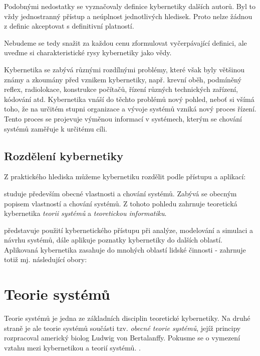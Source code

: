       Podobnými nedostatky se vyznačovaly definice kybernetiky dalších autorů. Byl to vždy 
      jednostranný přístup a neúplnost jednotlivých hledisek. Proto nelze žádnou z definic 
      akceptovat s definitivní platností.
      
      Nebudeme se tedy snažit za každou cenu zformulovat vyčerpávající definici, ale uveďme si 
      charakteristické rysy kybernetiky jako vědy.
      
      Kybernetika se zabývá různými rozdílnými problémy, které však byly většinou známy a zkoumány 
      před vznikem kybernetiky, např. krevní oběh, podmíněný reflex, radiolokace, konstrukce 
      počítačů, řízení různých technických zařízení, kódování atd. Kybernetika vnáší do těchto 
      problémů nový pohled, neboť si všímá toho, že na určitém stupni organizace a vývoje systémů 
      vzniká nový proces řízení. Tento proces se projevuje výměnou informací v systémech, kterým se 
      chování systémů zaměřuje k určitému cíli.
      
    \subsection{Rozdělení kybernetiky}
      Z praktického hlediska můžeme kybernetiku rozdělit podle přístupu a aplikací:
      
    \begin{description}[leftmargin=3em,labelindent=1em, style=nextline]
      \item[Teoretická kybernetika] studuje především obecné vlastnosti a chování systémů. Zabývá 
            se obecným popisem vlastností a chování systémů. Z tohoto pohledu zahrnuje teoretická 
            kybernetika \emph{teorii systémů} a \emph{teoretickou informatiku}.
      
      \item[Aplikovaná kybernetika] představuje použití kybernetického přístupu při analýze, 
      modelování a simulaci a návrhu systémů, dále aplikuje poznatky kybernetiky do dalších 
      oblastí. Aplikovaná kybernetika zasahuje do mnohých oblastí lidské činnosti - zahrnuje totiž 
      mj. následující obory:
    \end{description}
 
  \section{Teorie systémů}\label{tky:IchapIsecII}
     Teorie systémů je jedna ze základních disciplin teoretické kybernetiky. Na druhé straně je ale 
     teorie systémů součásti tzv. \emph{obecné teorie systémů}, jejíž principy rozpracoval americký 
     biolog Ludwig von Bertalanffy. Pokusme se o vymezení vztahu mezi kybernetikou a teorií systémů.
     \cite[s.~11]{Svarc1986}.
     
